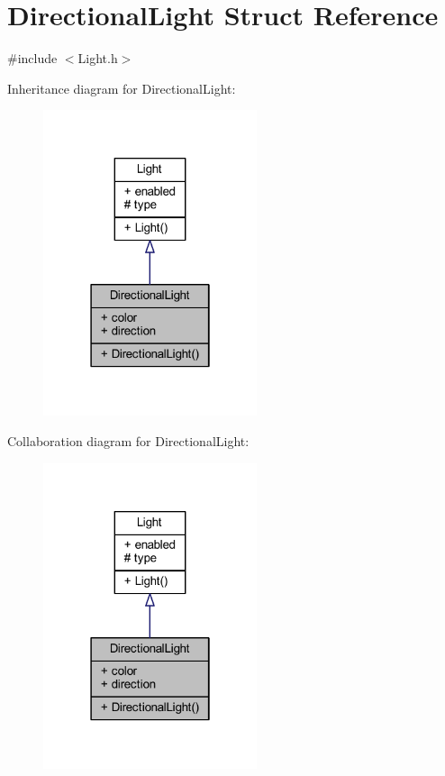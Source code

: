 \hypertarget{struct_directional_light}{}\section{Directional\+Light Struct Reference}
\label{struct_directional_light}


{\ttfamily \#include $<$Light.\+h$>$}



Inheritance diagram for Directional\+Light\+:\nopagebreak
\begin{figure}[H]
\begin{center}
\leavevmode
\includegraphics[width=178pt]{struct_directional_light__inherit__graph}
\end{center}
\end{figure}


Collaboration diagram for Directional\+Light\+:\nopagebreak
\begin{figure}[H]
\begin{center}
\leavevmode
\includegraphics[width=178pt]{struct_directional_light__coll__graph}
\end{center}
\end{figure}
